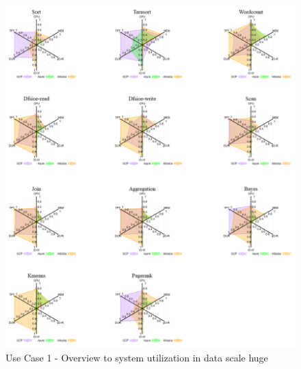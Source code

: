 \documentclass[review]{elsarticle}
\begin{document}
\begin{figure}[p]
	\caption{Use Case 1 - Overview to system utilization in data scale huge}
	\label{fig:uc1-huge-new}
	\includegraphics[width=\textwidth]{uc1-huge-new}
	\centering
\end{figure}
\end{document}
